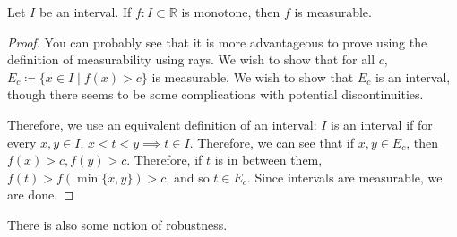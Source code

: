   \begin{theorem} 
    Let $I$ be an interval. If $f: I \subset \mathbb{R}$ is monotone, then $f$ is measurable.
  \end{theorem}
  \begin{proof}
    You can probably see that it is more advantageous to prove using the definition of measurability using rays. We wish to show that for all $c$, $E_c \coloneqq \{x \in I \mid f(x) > c\}$ is measurable. We wish to show that $E_c$ is an interval, though there seems to be some complications with potential discontinuities. 

    Therefore, we use an equivalent definition of an interval: $I$ is an interval if for every $x, y \in I$, $x < t < y \implies t \in I$. Therefore, we can see that if $x, y \in E_c$, then $f(x) > c, f(y) > c$. Therefore, if $t$ is in between them, $f(t) > f(\min\{x, y\}) > c$, and so $t \in E_c$. Since intervals are measurable, we are done. 
  \end{proof}

  There is also some notion of robustness. 

